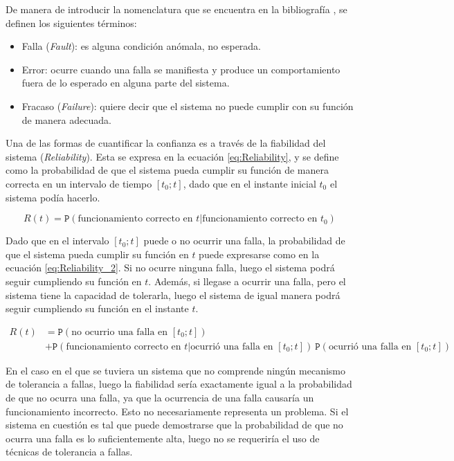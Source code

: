 De manera de introducir la nomenclatura que se encuentra en la bibliografía \cite{nelson1990fault}, se definen los siguientes términos:

\begin{itemize}
    \item Falla (\textit{Fault}): es alguna condición anómala, no esperada.
    \item Error: ocurre cuando una falla se manifiesta y produce un comportamiento fuera de lo esperado en alguna parte del sistema.
    \item Fracaso (\textit{Failure}): quiere decir que el sistema no puede cumplir con su función de manera adecuada.
\end{itemize}

Una de las formas de cuantificar la confianza es a través de la fiabilidad del sistema (\textit{Reliability}). Esta se expresa en la ecuación \eqref{eq:Reliability}, y se define como la probabilidad de que el sistema pueda cumplir su función de manera correcta en un intervalo de tiempo $[t_0;t]$, dado que en el instante inicial $t_0$ el sistema podía hacerlo.

\begin{equation}
    R(t) = \mathtt{P}\left( \text{funcionamiento correcto en $t$} | \text{funcionamiento correcto en $t_0$} \right)
    \label{eq:Reliability}
\end{equation}

Dado que en el intervalo $[t_0;t]$ puede o no ocurrir una falla, la probabilidad de que el sistema pueda cumplir su función en $t$ puede expresarse como en la ecuación \eqref{eq:Reliability_2}. Si no ocurre ninguna falla, luego el sistema podrá seguir cumpliendo su función en $t$. Además, si llegase a ocurrir una falla, pero el sistema tiene la capacidad de tolerarla, luego el sistema de igual manera podrá seguir cumpliendo su función en el instante $t$.

\begin{equation}
    \begin{aligned}
        R(t) &= \mathtt{P}\left( \text{no ocurrio una falla en $[t_0;t]$} \right)\\ &+ \mathtt{P}\left( \text{funcionamiento correcto en $t$}|\text{ocurrió una falla en $[t_0;t]$} \right) \ \mathtt{P}\left( \text{ocurrió una falla en $[t_0;t]$} \right)
    \end{aligned}
    \label{eq:Reliability_2}
\end{equation}

En el caso en el que se tuviera un sistema que no comprende ningún mecanismo de tolerancia a fallas, luego la fiabilidad sería exactamente igual a la probabilidad de que no ocurra una falla, ya que la ocurrencia de una falla causaría un funcionamiento incorrecto. Esto no necesariamente representa un problema. Si el sistema en cuestión es tal que puede demostrarse que la probabilidad de que no ocurra una falla es lo suficientemente alta, luego no se requeriría el uso de técnicas de tolerancia a fallas.

